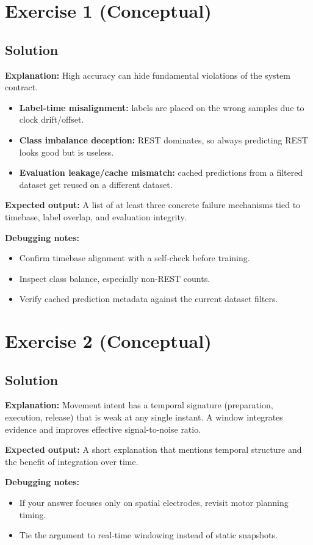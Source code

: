 \documentclass[11pt,openany]{book}
\newcommand{\solution}[1]{%
\subsection*{Solution}
#1
}
\begin{document}
\section{Exercise 1 (Conceptual)}
\solution{
\textbf{Explanation:} High accuracy can hide fundamental violations of the system contract.
\begin{itemize}
\item \textbf{Label-time misalignment:} labels are placed on the wrong samples due to clock drift/offset.
\item \textbf{Class imbalance deception:} REST dominates, so always predicting REST looks good but is useless.
\item \textbf{Evaluation leakage/cache mismatch:} cached predictions from a filtered dataset get reused on a different dataset.
\end{itemize}

\textbf{Expected output:} A list of at least three concrete failure mechanisms tied to timebase, label overlap, and evaluation integrity.

\textbf{Debugging notes:}
\begin{itemize}
\item Confirm timebase alignment with a self-check before training.
\item Inspect class balance, especially non-REST counts.
\item Verify cached prediction metadata against the current dataset filters.
\end{itemize}
}

\section{Exercise 2 (Conceptual)}
\solution{
\textbf{Explanation:} Movement intent has a temporal signature (preparation, execution, release) that is weak at any single instant.
A window integrates evidence and improves effective signal-to-noise ratio.

\textbf{Expected output:} A short explanation that mentions temporal structure and the benefit of integration over time.

\textbf{Debugging notes:}
\begin{itemize}
\item If your answer focuses only on spatial electrodes, revisit motor planning timing.
\item Tie the argument to real-time windowing instead of static snapshots.
\end{itemize}
}
\end{document}
